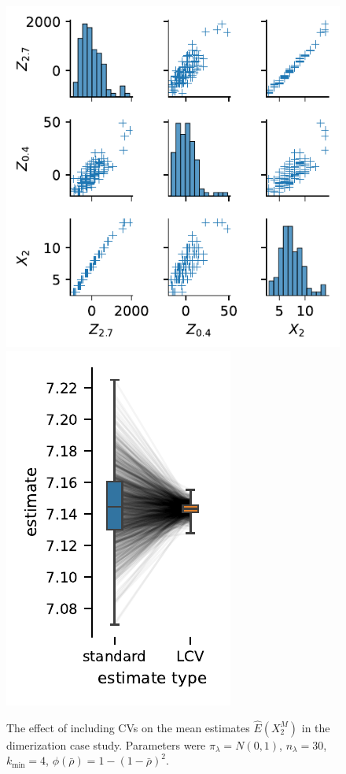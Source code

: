 \begin{figure}[htb]
    \centering
    \includegraphics[scale=.65]{gfx/correlation.pdf}
    \hspace*{2em}
    \includegraphics[scale=.65]{gfx/adjustment.pdf}
    \caption[\ac{CV} mean estimates v.\ std.\ mean estimates]{The effect of including \acp{CV} on the mean estimates $\hat{E}(X^M_2)$ in the dimerization case study. Parameters were ${\pi}_{\lambda}=N(0,1)$, ${n}_{\lambda}=30$, ${k}_{\min}=4$, $\phi(\bar\rho)=1-{(1 - \bar\rho)}^2$.}
\end{figure}


